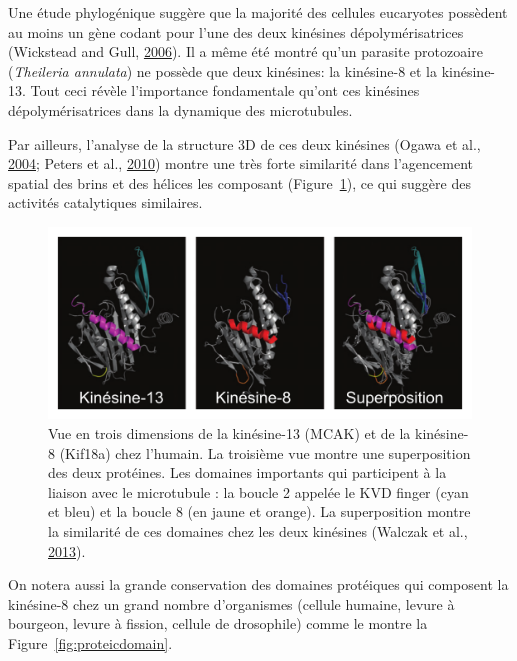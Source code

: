 \documentclass[12pt,a4paper,twoside,openright]{book}
\begin{document}
Une étude phylogénique suggère que la majorité des cellules eucaryotes
possèdent au moins un gène codant pour l'une des deux kinésines
dépolymérisatrices (Wickstead and Gull,
\protect\hyperlink{ref-Wickstead2006}{2006}). Il a même été montré qu'un
parasite protozoaire (\emph{Theileria annulata}) ne possède que deux
kinésines: la kinésine-8 et la kinésine-13. Tout ceci révèle
l'importance fondamentale qu'ont ces kinésines dépolymérisatrices dans
la dynamique des microtubules.

Par ailleurs, l'analyse de la structure 3D de ces deux kinésines (Ogawa
et al., \protect\hyperlink{ref-Ogawa2004}{2004}; Peters et al.,
\protect\hyperlink{ref-Peters2010}{2010}) montre une très forte
similarité dans l'agencement spatial des brins et des hélices les
composant (Figure~\ref{fig:dep_kinesin}), ce qui suggère des activités
catalytiques similaires.

\begin{figure}[htbp]
\centering
\includegraphics{figures/intro/dep_kinesin.png}
\caption[Reconstruction 3D des kinésines dépolymérisatrice]{\label{fig:dep_kinesin}Vue
en trois dimensions de la kinésine-13 (MCAK) et de la kinésine-8
(Kif18a) chez l'humain. La troisième vue montre une superposition des
deux protéines. Les domaines importants qui participent à la liaison
avec le microtubule : la boucle 2 appelée le KVD finger (cyan et bleu)
et la boucle 8 (en jaune et orange). La superposition montre la
similarité de ces domaines chez les deux kinésines (Walczak et al.,
\protect\hyperlink{ref-Walczak2013a}{2013}).}
\end{figure}

On notera aussi la grande conservation des domaines protéiques qui
composent la kinésine-8 chez un grand nombre d'organismes (cellule
humaine, levure à bourgeon, levure à fission, cellule de drosophile)
comme le montre la Figure~\ref{fig:proteicdomain}.
\end{document}
